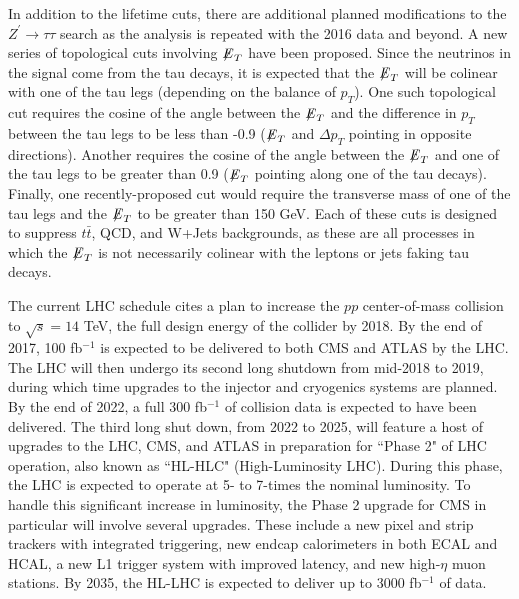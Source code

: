 In addition to the lifetime cuts, there are additional planned modifications to the $Z^\prime\to\tau\tau$ search as the analysis is repeated with the 2016 data and beyond. A new series of topological cuts involving ${\not\mathrel{E}}_T$ have been proposed. Since the neutrinos in the signal come from the tau decays, it is expected that the ${\not\mathrel{E}}_T$ will be colinear with one of the tau legs (depending on the balance of $p_T$). One such topological cut requires the cosine of the angle between the ${\not\mathrel{E}}_T$ and the difference in $p_T$ between the tau legs to be less than -0.9 (${\not\mathrel{E}}_T$ and $\Delta p_T$ pointing in opposite directions). Another requires the cosine of the angle between the ${\not\mathrel{E}}_T$ and one of the tau legs to be greater than 0.9 (${\not\mathrel{E}}_T$ pointing along one of the tau decays). Finally, one recently-proposed cut would require the transverse mass of one of the tau legs and the ${\not\mathrel{E}}_T$ to be greater than 150 GeV. Each of these cuts is designed to suppress $t\bar{t}$, QCD, and W+Jets backgrounds, as these are all processes in which the ${\not\mathrel{E}}_T$ is not necessarily colinear with the leptons or jets faking tau decays.

The current LHC schedule cites a plan to increase the $pp$ center-of-mass collision to $\sqrt{s} = 14$ TeV, the full design energy of the collider by 2018. By the end of 2017, 100 fb$^{-1}$ is expected to be delivered to both CMS and ATLAS by the LHC. The LHC will then undergo its second long shutdown from mid-2018 to 2019, during which time upgrades to the injector and cryogenics systems are planned. By the end of 2022, a full 300 fb$^{-1}$ of collision data is expected to have been delivered. The third long shut down, from 2022 to 2025, will feature a host of upgrades to the LHC, CMS, and ATLAS in preparation for ``Phase 2" of LHC operation, also known as ``HL-HLC" (High-Luminosity LHC).\cite{LHCSchedule} During this phase, the LHC is expected to operate at 5- to 7-times the nominal luminosity. To handle this significant increase in luminosity, the Phase 2 upgrade for CMS in particular will involve several upgrades. These include a new pixel and strip trackers with integrated triggering, new endcap calorimeters in both ECAL and HCAL, a new L1 trigger system with improved latency, and new high-$\eta$ muon stations.\cite{CMSUpgrade} By 2035, the HL-LHC is expected to deliver up to 3000 fb$^{-1}$ of data.\cite{LHCSchedule} 

